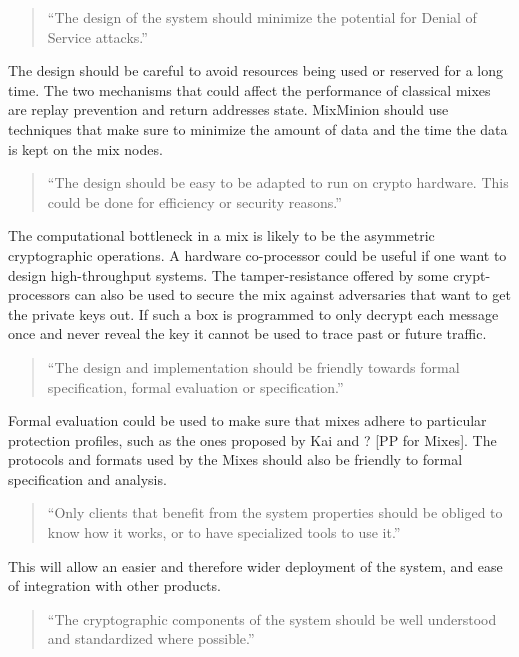 \documentclass{article}
\begin{document}
\begin{quote}
     ``The design of the system should minimize the potential for
     Denial of Service attacks.''
\end{quote}

The design should be careful to avoid resources being used or reserved
for a long time. The two mechanisms that could affect the performance
of classical mixes are replay prevention and return addresses
state. MixMinion should use techniques that make sure to minimize the
amount of data and the time the data is kept on the mix nodes. 

\begin{quote}
     ``The design should be easy to be adapted to run on crypto
     hardware. This could be done for efficiency or security reasons.''
\end{quote}

The computational bottleneck in a mix is likely to be the asymmetric
cryptographic operations. A hardware co-processor could be useful if
one want to design high-throughput systems. The tamper-resistance
offered by some crypt-processors can also be used to secure the mix
against adversaries that want to get the private keys out. If such a
box is programmed to only decrypt each message once and never reveal
the key it cannot be used to trace past or future traffic.

\begin{quote}
     ``The design and implementation should be friendly towards formal
     specification, formal evaluation or specification.''
\end{quote}

Formal evaluation could be used to make sure that mixes adhere to
particular protection profiles, such as the ones proposed by Kai and ?
[PP for Mixes]. The protocols and formats used by the Mixes should
also be friendly to formal specification and analysis.

\begin{quote}
     ``Only clients that benefit from the system properties should be
     obliged to know how it works, or to have specialized tools to use
     it.''
\end{quote}

This will allow an easier and therefore wider deployment of the
system, and ease of integration with other products.

\begin{quote}
     ``The cryptographic components of the system should be well
     understood and standardized where possible.''
\end{quote}
\end{document}
